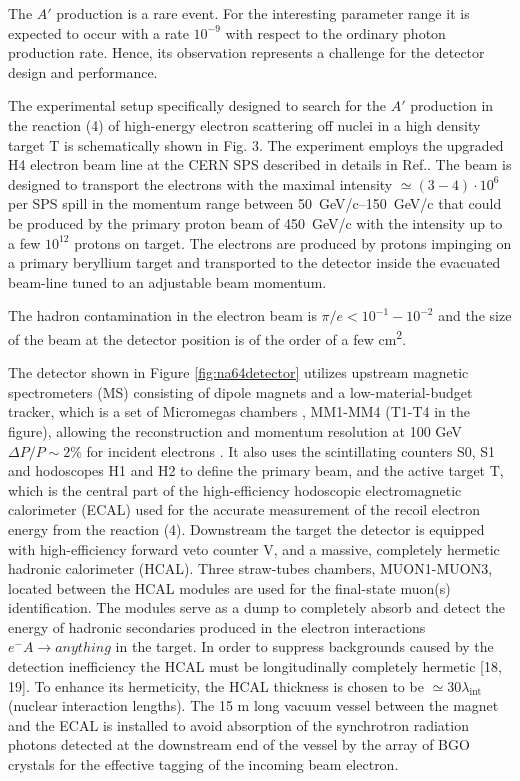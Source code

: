 The $A'$ production is a rare event. For the interesting parameter range it is expected to occur with a rate $10^{-9}$
with respect to the ordinary photon production rate. Hence, its observation represents a challenge for the detector
design and performance.\par

The experimental setup specifically designed to search for the $A'$ production in the reaction (4) of high-energy
electron scattering off nuclei in a high density target T is schematically shown in Fig. 3. The experiment employs the
upgraded H4 electron beam line at the CERN SPS described in details in Ref.\cite{sps}. The beam is designed
to transport the electrons with the maximal intensity $\simeq (3-4) \cdot 10^6$ per SPS spill in the momentum range
between \SIrange{50}{150}{GeV/c} that could be produced by the primary proton beam of \SI{450}{GeV/c} with the intensity
up to a few $10^{12}$ protons on target. The electrons are produced by protons impinging on a primary beryllium target and
transported to the detector inside the evacuated beam-line tuned to an adjustable beam momentum. \par

The hadron contamination in the electron beam is $\pi/e < 10^{-1}-10^{-2}$ and the size of the beam at the detector position is
of the order of a few \si{\square\centi\metre}.

The detector shown in Figure \ref{fig:na64detector} utilizes upstream magnetic spectrometers (MS) consisting of dipole
magnets and a low-material-budget tracker, which is a set of Micromegas chambers , MM1-MM4 (T1-T4 in the figure),
allowing the reconstruction and momentum resolution at 100 GeV $\Delta P/P\sim 2\%$ for incident electrons \cite{mm}. It
also uses the scintillating counters S0, S1 and hodoscopes H1 and H2 to define the primary beam, and the active target
T, which is the central part of the high-efficiency hodoscopic electromagnetic calorimeter (ECAL) used for the accurate
measurement of the recoil electron energy from the reaction (4). Downstream the target the detector is equipped with
high-efficiency forward veto counter V, and a massive, completely hermetic hadronic calorimeter (HCAL). Three
straw-tubes chambers, MUON1-MUON3, located between the HCAL modules are used for the final-state muon(s) identification.
The modules serve as a dump to completely absorb and detect the energy of hadronic secondaries produced in the electron
interactions $e^-A\rightarrow anything$ in the target. In order to suppress backgrounds caused by the detection
inefficiency the HCAL must be longitudinally completely hermetic [18, 19]. To enhance its hermeticity, the HCAL
thickness is chosen to be $\simeq  30 \lambda_{\mathrm{int}}$ (nuclear interaction lengths). The 15 m long vacuum vessel
between the magnet and the ECAL is installed to avoid absorption of the synchrotron radiation photons detected at the
downstream end of the vessel by the array of BGO crystals for the effective tagging of the incoming beam electron.



